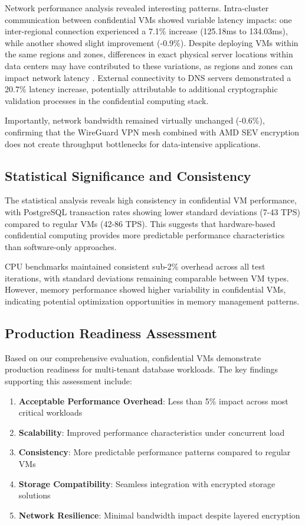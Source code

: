 Network performance analysis revealed interesting patterns. Intra-cluster communication between confidential VMs showed variable latency impacts: one inter-regional connection experienced a 7.1\% increase (125.18ms to 134.03ms), while another showed slight improvement (-0.9\%). Despite deploying VMs within the same regions and zones, differences in exact physical server locations within data centers may have contributed to these variations, as regions and zones can impact network latency \parencite{google_cloud_regions_zones_2024}. External connectivity to DNS servers demonstrated a 20.7\% latency increase, potentially attributable to additional cryptographic validation processes in the confidential computing stack.

Importantly, network bandwidth remained virtually unchanged (-0.6\%), confirming that the WireGuard VPN mesh combined with AMD SEV encryption does not create throughput bottlenecks for data-intensive applications.

\subsection{Statistical Significance and Consistency}

The statistical analysis reveals high consistency in confidential VM performance, with PostgreSQL transaction rates showing lower standard deviations (7-43 TPS) compared to regular VMs (42-86 TPS). This suggests that hardware-based confidential computing provides more predictable performance characteristics than software-only approaches.

CPU benchmarks maintained consistent sub-2\% overhead across all test iterations, with standard deviations remaining comparable between VM types. However, memory performance showed higher variability in confidential VMs, indicating potential optimization opportunities in memory management patterns.

\subsection{Production Readiness Assessment}

Based on our comprehensive evaluation, confidential VMs demonstrate production readiness for multi-tenant database workloads. The key findings supporting this assessment include:

\begin{enumerate}
\item \textbf{Acceptable Performance Overhead}: Less than 5\% impact across most critical workloads
\item \textbf{Scalability}: Improved performance characteristics under concurrent load
\item \textbf{Consistency}: More predictable performance patterns compared to regular VMs
\item \textbf{Storage Compatibility}: Seamless integration with encrypted storage solutions
\item \textbf{Network Resilience}: Minimal bandwidth impact despite layered encryption
\end{enumerate}

